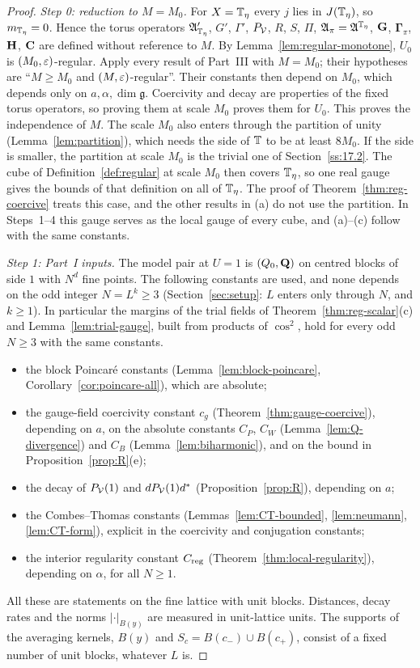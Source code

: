 \begin{proof}
\emph{Step 0: reduction to $M=M_0$.} For $X=\mathbb T_\eta$ every $j$ lies in $J(\mathbb T_\eta)$, so $m_{\mathbb T_\eta}=0$. Hence the torus operators $\mathfrak A'_{\mathbb T_\eta}$, $G'$, $\Gamma'$, $P_\mathcal V$, $R$, $S$, $\Pi$, $\mathfrak A_\pi=\mathfrak A^{\mathbb T_\eta}$, $\mathbf G$, $\boldsymbol\Gamma_\pi$, $\mathbf H$, $\mathbf C$ are defined without reference to $M$. By Lemma~\ref{lem:regular-monotone}, $U_0$ is $(M_0,\varepsilon)$-regular. Apply every result of Part~III with $M=M_0$; their hypotheses are ``$M\ge M_0$ and $(M,\varepsilon)$-regular''. Their constants then depend on $M_0$, which depends only on $a,\alpha,\dim\mathfrak g$. Coercivity and decay are properties of the fixed torus operators, so proving them at scale $M_0$ proves them for $U_0$. This proves the independence of $M$. The scale $M_0$ also enters through the partition of unity (Lemma~\ref{lem:partition}), which needs the side of $\mathbb T$ to be at least $8M_0$. If the side is smaller, the partition at scale $M_0$ is the trivial one of Section~\ref{ss:17.2}. The cube of Definition~\ref{def:regular} at scale $M_0$ then covers $\mathbb T_\eta$, so one real gauge gives the bounds of that definition on all of $\mathbb T_\eta$. The proof of Theorem~\ref{thm:reg-coercive} treats this case, and the other results in (a) do not use the partition. In Steps~1--4 this gauge serves as the local gauge of every cube, and (a)--(c) follow with the same constants.

\emph{Step 1: Part~I inputs.} The model pair at $U=1$ is $(Q_0,\mathbf Q)$ on centred blocks of side $1$ with $N^d$ fine points. The following constants are used, and none depends on the odd integer $N=L^k\ge3$ (Section~\ref{sec:setup}: $L$ enters only through $N$, and $k\ge1$). In particular the margins of the trial fields of Theorem~\ref{thm:reg-scalar}(c) and Lemma~\ref{lem:trial-gauge}, built from products of $\cos^2$, hold for every odd $N\ge3$ with the same constants.
\begin{itemize}
\item the block Poincar\'e constants (Lemma~\ref{lem:block-poincare}, Corollary~\ref{cor:poincare-all}), which are absolute;
\item the gauge-field coercivity constant $c_g$ (Theorem~\ref{thm:gauge-coercive}), depending on $a$, on the absolute constants $C_P$, $C_W$ (Lemma~\ref{lem:Q-divergence}) and $C_B$ (Lemma~\ref{lem:biharmonic}), and on the bound in Proposition~\ref{prop:R}(e);
\item the decay of $P_\mathcal V(1)$ and $dP_\mathcal V(1)d^*$ (Proposition~\ref{prop:R}), depending on $a$;
\item the Combes--Thomas constants (Lemmas~\ref{lem:CT-bounded}, \ref{lem:neumann}, \ref{lem:CT-form}), explicit in the coercivity and conjugation constants;
\item the interior regularity constant $C_{\rm reg}$ (Theorem~\ref{thm:local-regularity}), depending on $\alpha$, for all $N\ge1$.
\end{itemize}
All these are statements on the fine lattice with unit blocks. Distances, decay rates and the norms $|\cdot|_{B(y)}$ are measured in unit-lattice units. The supports of the averaging kernels, $B(y)$ and $S_c=B(c_-)\cup B(c_+)$, consist of a fixed number of unit blocks, whatever $L$ is.


\end{proof}
